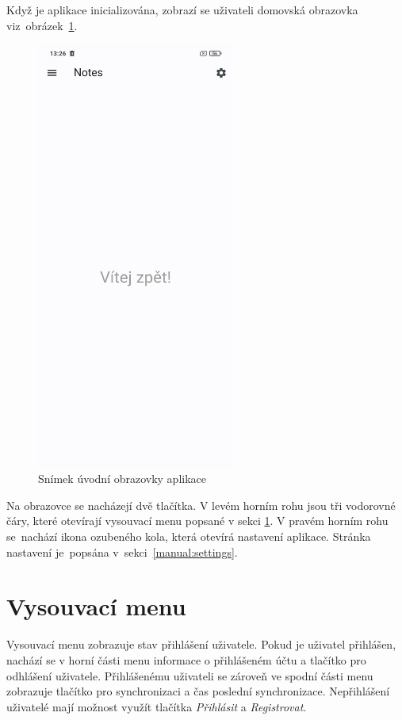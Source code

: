 \documentclass[czech, bc, kiv, he, iso690numb]{fasthesis}
\begin{document}
Když je aplikace inicializována, zobrazí se uživateli domovská obrazovka viz~obrázek~\ref{fig:WelcomeScreen}.

\begin{figure}[h!]
  \centering
  \includegraphics[width=0.58\textwidth]{img/BP-Runt/UserManual/WelcomePage.jpg}
  \caption{Snímek úvodní obrazovky aplikace}
  \label{fig:WelcomeScreen}
\end{figure}

Na obrazovce se nacházejí dvě tlačítka. V levém horním rohu jsou tři vodorovné čáry, které otevírají vysouvací menu popsané v sekci \ref{manual:drawer}. V pravém horním rohu se~nachází ikona ozubeného kola, která otevírá nastavení aplikace. Stránka nastavení je~popsána v~sekci~\ref{manual:settings}.

\section{Vysouvací menu} \label{manual:drawer}

Vysouvací menu zobrazuje stav přihlášení uživatele. Pokud je uživatel přihlášen, nachází se v horní části menu informace o přihlášeném účtu a tlačítko pro odhlášení uživatele. Přihlášenému uživateli se zároveň ve spodní části menu zobrazuje tlačítko pro synchronizaci a čas poslední synchronizace. Nepřihlášení uživatelé mají možnost využít tlačítka \textit{Přihlásit} a \textit{Registrovat}.
\end{document}
